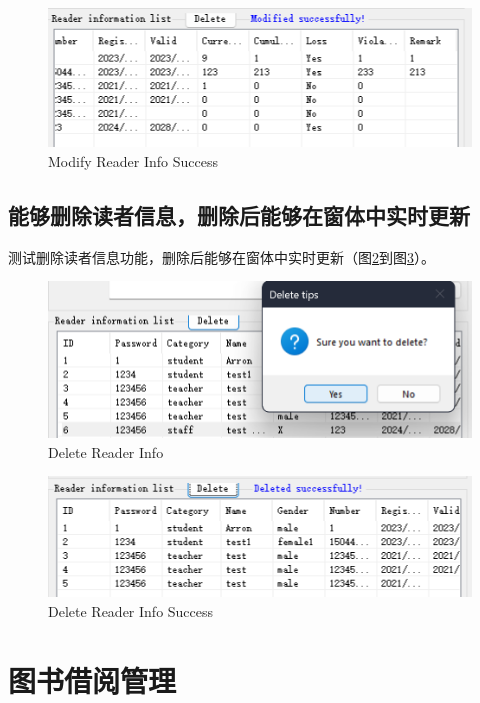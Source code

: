 \documentclass{article}
\begin{document}
\begin{figure}[H]
    \centering
    \includegraphics[width=1\textwidth]{../pic/modify_suc.png}
    \caption{Modify Reader Info Success}
    \label{fig:modify_suc}
\end{figure}

\subsection{能够删除读者信息，删除后能够在窗体中实时更新}
测试删除读者信息功能，删除后能够在窗体中实时更新（图\ref{fig:delete}到图\ref{fig:delete_suc}）。

\begin{figure}[H]
    \centering
    \includegraphics[width=1\textwidth]{../pic/delete.png}
    \caption{Delete Reader Info}
    \label{fig:delete}
\end{figure}

\begin{figure}[H]
    \centering
    \includegraphics[width=1\textwidth]{../pic/delete_suc.png}
    \caption{Delete Reader Info Success}
    \label{fig:delete_suc}
\end{figure}

\section{图书借阅管理}
\end{document}
